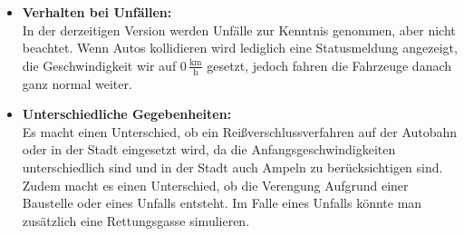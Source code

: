 \begin{itemize}
\item \textbf{Verhalten bei Unfällen:}\\
In der derzeitigen Version werden Unfälle zur Kenntnis genommen, aber nicht beachtet. Wenn Autos kollidieren wird lediglich eine Statusmeldung angezeigt, die Geschwindigkeit wir auf 0\,$ \frac{\text{km}}{\text{h}} $ gesetzt, jedoch fahren die Fahrzeuge danach ganz normal weiter.

\item \textbf{Unterschiedliche Gegebenheiten:}\\
Es macht einen Unterschied, ob ein Reißverschlussverfahren auf der Autobahn oder in der Stadt eingesetzt wird, da die Anfangsgeschwindigkeiten unterschiedlich sind und in der Stadt auch Ampeln zu berücksichtigen sind.\\
Zudem macht es einen Unterschied, ob die Verengung Aufgrund einer Baustelle oder eines Unfalls entsteht. Im Falle eines Unfalls könnte man zusätzlich eine Rettungsgasse simulieren.
\end{itemize}